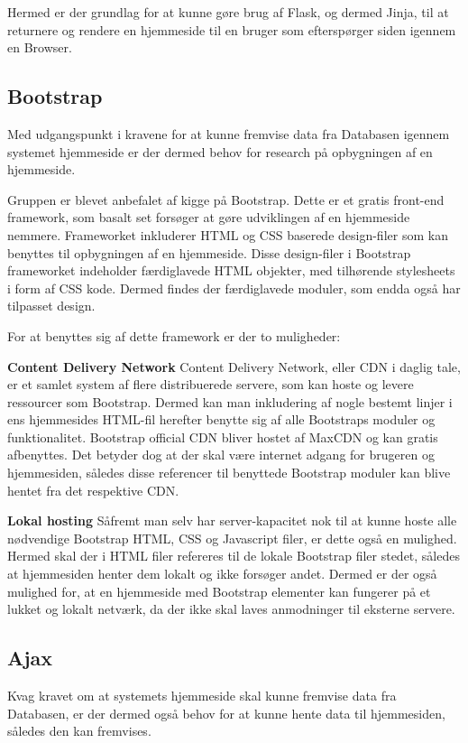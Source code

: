\begin{appendices}
Hermed er der grundlag for at kunne gøre brug af Flask, og dermed Jinja, til at returnere og rendere en hjemmeside til en bruger som efterspørger siden igennem en Browser.

\subsection{Bootstrap}

Med udgangspunkt i kravene for at kunne fremvise data fra Databasen igennem systemet hjemmeside er der dermed behov for research på opbygningen af en hjemmeside.

Gruppen er blevet anbefalet af kigge på Bootstrap. Dette er et gratis front-end framework, som basalt set forsøger at gøre udviklingen af en hjemmeside nemmere.
Frameworket inkluderer HTML og CSS baserede design-filer som kan benyttes til opbygningen af en hjemmeside. Disse design-filer i Bootstrap frameworket indeholder færdiglavede HTML objekter, med tilhørende stylesheets i form af CSS kode. Dermed findes der færdiglavede moduler, som endda også har tilpasset design.

For at benyttes sig af dette framework er der to muligheder:

\textbf{Content Delivery Network} \newline
Content Delivery Network, eller CDN i daglig tale, er et samlet system af flere distribuerede servere, som kan hoste og levere ressourcer som Bootstrap. Dermed kan man inkludering af nogle bestemt linjer i ens hjemmesides HTML-fil herefter benytte sig af alle Bootstraps moduler og funktionalitet. Bootstrap official CDN bliver hostet af MaxCDN og kan gratis afbenyttes. Det betyder dog at der skal være internet adgang for brugeren og hjemmesiden, således disse referencer til benyttede Bootstrap moduler kan blive hentet fra det respektive CDN.

\textbf{Lokal hosting} \newline
Såfremt man selv har server-kapacitet nok til at kunne hoste alle nødvendige Bootstrap HTML, CSS og Javascript filer, er dette også en mulighed. Hermed skal der i HTML filer refereres til de lokale Bootstrap filer stedet, således at hjemmesiden henter dem lokalt og ikke forsøger andet. Dermed er der også mulighed for, at en hjemmeside med Bootstrap elementer kan fungerer på et lukket og lokalt netværk, da der ikke skal laves anmodninger til eksterne servere.

\subsection{Ajax}
Kvag kravet om at systemets hjemmeside skal kunne fremvise data fra Databasen, er der dermed også behov for at kunne hente data til hjemmesiden, således den kan fremvises.


\end{appendices}
